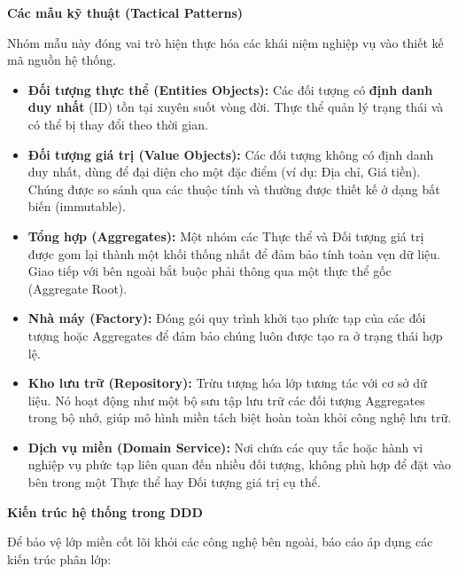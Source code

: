 \vspace{0.5em}
\textbf{Các mẫu kỹ thuật (Tactical Patterns)}

Nhóm mẫu này đóng vai trò hiện thực hóa các khái niệm nghiệp vụ vào thiết kế mã nguồn hệ thống.

\begin{itemize}
\item \textbf{Đối tượng thực thể (Entities Objects):} Các đối tượng có \textbf{định danh duy nhất} (ID) tồn tại xuyên suốt vòng đời. Thực thể quản lý trạng thái và có thể bị thay đổi theo thời gian.

\item \textbf{Đối tượng giá trị (Value Objects):} Các đối tượng không có định danh duy nhất, dùng để đại diện cho một đặc điểm (ví dụ: Địa chỉ, Giá tiền). Chúng được so sánh qua các thuộc tính và thường được thiết kế ở dạng bất biến (immutable).

\item \textbf{Tổng hợp (Aggregates):} Một nhóm các Thực thể và Đối tượng giá trị được gom lại thành một khối thống nhất để đảm bảo tính toàn vẹn dữ liệu. Giao tiếp với bên ngoài bắt buộc phải thông qua một thực thể gốc (Aggregate Root).

\item \textbf{Nhà máy (Factory):} Đóng gói quy trình khởi tạo phức tạp của các đối tượng hoặc Aggregates để đảm bảo chúng luôn được tạo ra ở trạng thái hợp lệ.

\item \textbf{Kho lưu trữ (Repository):} Trừu tượng hóa lớp tương tác với cơ sở dữ liệu. Nó hoạt động như một bộ sưu tập lưu trữ các đối tượng Aggregates trong bộ nhớ, giúp mô hình miền tách biệt hoàn toàn khỏi công nghệ lưu trữ.

\item \textbf{Dịch vụ miền (Domain Service):} Nơi chứa các quy tắc hoặc hành vi nghiệp vụ phức tạp liên quan đến nhiều đối tượng, không phù hợp để đặt vào bên trong một Thực thể hay Đối tượng giá trị cụ thể.
\end{itemize}

\vspace{0.5em}
\textbf{Kiến trúc hệ thống trong DDD}

Để bảo vệ lớp miền cốt lõi khỏi các công nghệ bên ngoài, báo cáo áp dụng các kiến trúc phân lớp:

